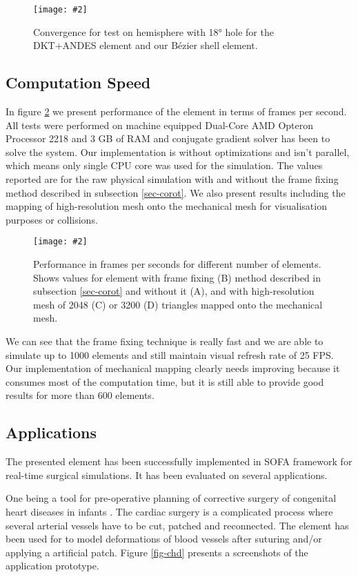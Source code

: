 \documentclass{egpubl}
\newcommand{\Figure}[3]{%
\begin{figure}[htb]
  \centering
  \texttt{[image: \#2]}
  \caption{\label{fig-#2}#3}
\end{figure}}
\begin{document}
\Figure{\linewidth}{hemisphere}
{Convergence for test on hemisphere with 18° hole for the DKT+ANDES element and
our B\'ezier shell element.}

\subsection{Computation Speed}

In figure \ref{fig-fps} we present performance of the element in terms of
frames per second. All tests were performed on machine equipped Dual-Core
AMD Opteron Processor 2218 and 3 GB of RAM and conjugate gradient solver
has been to solve the system. Our implementation is without optimizations
and isn't parallel, which means only single CPU core was used for the
simulation. The values reported are for the raw physical simulation with
and without the frame fixing method described in subsection
\ref{sec-corot}. We also present results including the mapping of
high-resolution mesh onto the mechanical mesh for visualisation purposes or
collisions.

\Figure{\linewidth}{fps}
{Performance in frames per seconds for different number of elements. Shows
values for element with frame fixing (B) method described in subsection
\ref{sec-corot} and without it (A), and with high-resolution mesh of 2048
(C) or 3200 (D) triangles mapped onto the mechanical mesh.}

We can see that the frame fixing technique is really fast and we are able
to simulate up to 1000 elements and still maintain visual refresh rate of
25 FPS. Our implementation of mechanical mapping clearly needs improving
because it consumes most of the computation time, but it is still able to
provide good results for more than 600 elements.

\subsection{Applications}

The presented element has been successfully implemented in SOFA framework
\cite{Faure2012} for real-time surgical simulations. It has been evaluated
on several applications.

One being a tool for pre-operative planning of corrective surgery of
congenital heart diseases in infants \cite{Kislinskiy2012}. The cardiac
surgery is a complicated process where several arterial vessels have to be
cut, patched and reconnected. The element has been used for to model
deformations of blood vessels after suturing and/or applying a artificial
patch. Figure \ref{fig-chd} presents a screenshots of the application
prototype.
\end{document}
